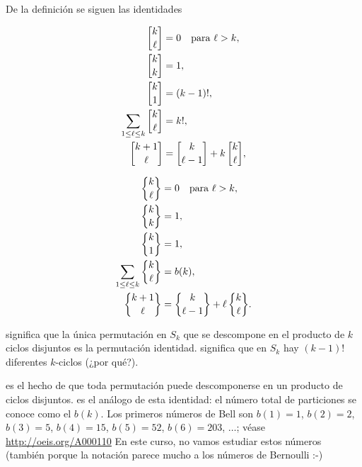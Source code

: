 \documentclass{article}
\begin{document}
\pagebreak

De la definición se siguen las identidades

\begin{align}
\label{eqn:stirling-I-0} \stirling{k}{\ell} & = 0 \quad\text{para }\ell > k,\\
\label{eqn:stirling-I-1} \stirling{k}{k} & = 1,\\
\label{eqn:stirling-I-2} \stirling{k}{1} & = (k-1)!,\\
\label{eqn:stirling-I-3} \sum_{1 \le \ell \le k} \stirling{k}{\ell} & = k!,\\
\label{eqn:stirling-I-recur} \stirling{k+1}{\ell} & = \stirling{k}{\ell-1} + k\,\stirling{k}{\ell},
\end{align}

\begin{align}
\label{eqn:stirling-II-0} \Stirling{k}{\ell} & = 0 \quad\text{para }\ell > k,\\
\label{eqn:stirling-II-1} \Stirling{k}{k} & = 1,\\
\label{eqn:stirling-II-2} \Stirling{k}{1} & = 1,\\
\label{eqn:stirling-II-3} \sum_{1 \le \ell \le k} \Stirling{k}{\ell} & = b (k),\\
\label{eqn:stirling-II-recur} \Stirling{k+1}{\ell} & = \Stirling{k}{\ell-1} + \ell\,\Stirling{k}{\ell}.
\end{align}

 significa que la única permutación en $S_k$ que se descompone en el producto de $k$ ciclos disjuntos es la permutación identidad.  significa que en $S_k$ hay $(k-1)!$ diferentes $k$-ciclos (¿por qué?).

 es el hecho de que toda permutación puede descomponerse en un producto de ciclos disjuntos.  es el análogo de esta identidad: el número total de particiones se conoce como el  $b (k)$. Los primeros números de Bell son $b (1) = 1$, $b (2) = 2$, $b (3) = 5$, $b (4) = 15$, $b (5) = 52$, $b (6) = 203$, $\ldots$; véase \url{http://oeis.org/A000110} En este curso, no vamos estudiar estos números (también porque la notación parece mucho a los números de Bernoulli :-)
\end{document}
